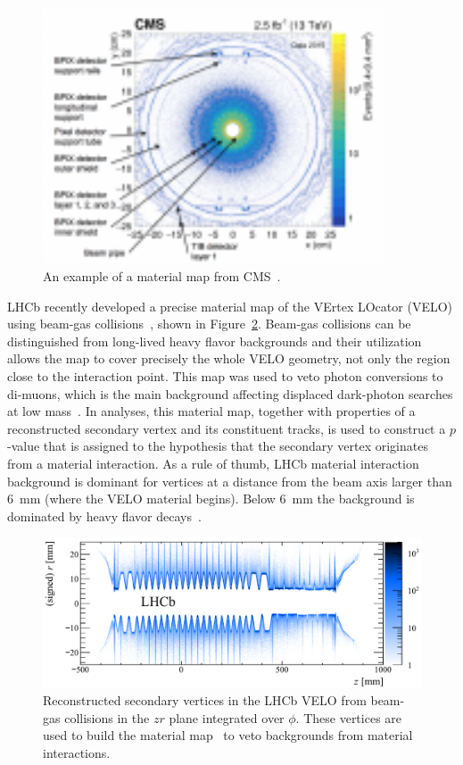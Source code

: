 %
\begin{figure}[t]
  \centering
   \includegraphics[width=0.9\textwidth]{figures/cmsmaterial.pdf}
  \caption{An example of a material map from CMS~\cite{Sirunyan:2018icq}.
  }
  \label{fig:materialmapCMS}
\end{figure}

LHCb recently developed a precise material map of the VErtex LOcator (VELO) using beam-gas collisions~\cite{Alexander:2018png}, shown in Figure~\ref{fig:lhcbmaterialmap}. Beam-gas collisions can be distinguished from long-lived heavy flavor backgrounds and their utilization allows the map to cover precisely the whole VELO geometry, not only the region close to the interaction point. This map was used to veto photon conversions to di-muons, which is the main background affecting displaced dark-photon searches at low mass~\cite{Aaij:2017rft}. In analyses, this material map, together with properties of a reconstructed secondary vertex and its constituent tracks, is used to construct a $p$-value that is assigned to the hypothesis that the secondary vertex originates from a material interaction. As a rule of thumb, LHCb material interaction background is dominant for vertices at a distance from the beam axis larger than 6~mm (where the VELO material begins). Below 6~mm the background is dominated by heavy flavor decays~\cite{Ilten:2016tkc}.

\begin{figure}[t]
  \centering
  \includegraphics[width=\textwidth]{figures/lhcbmaterial.pdf}
  \caption{Reconstructed secondary vertices in the LHCb VELO from beam-gas collisions in the $zr$ plane integrated over $\phi$. These vertices are used to build the material map~\cite{Alexander:2018png} to veto backgrounds from material interactions.
  }
  \label{fig:lhcbmaterialmap}
\end{figure}

